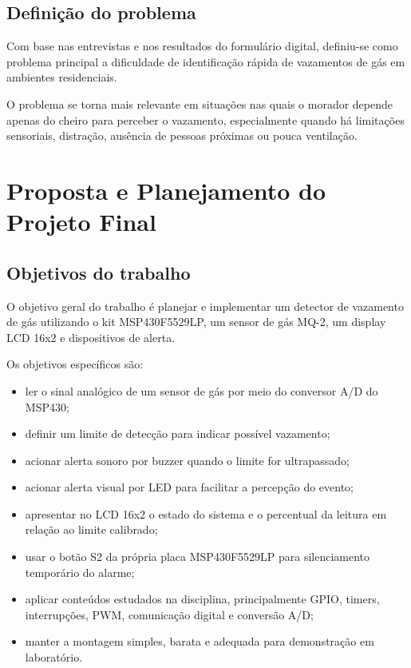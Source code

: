 \documentclass[11pt,a4paper]{article}
\numberwithin{equation}{section}
\begin{document}
\subsection{Definição do problema}

Com base nas entrevistas e nos resultados do formulário digital, definiu-se como problema principal a
dificuldade de identificação rápida de vazamentos de gás em ambientes residenciais.

O problema se torna mais relevante em situações nas quais o morador depende apenas do cheiro para
perceber o vazamento, especialmente quando há limitações sensoriais, distração, ausência de pessoas
próximas ou pouca ventilação.

\section{Proposta e Planejamento do Projeto Final}
\label{cap:proposta}

\subsection{Objetivos do trabalho}

O objetivo geral do trabalho é planejar e implementar um detector de vazamento de gás utilizando o kit
MSP430F5529LP, um sensor de gás MQ-2, um display LCD 16x2 e dispositivos de alerta.

Os objetivos específicos são:

\begin{itemize}
  \item ler o sinal analógico de um sensor de gás por meio do conversor A/D do MSP430;
  \item definir um limite de detecção para indicar possível vazamento;
  \item acionar alerta sonoro por buzzer quando o limite for ultrapassado;
  \item acionar alerta visual por LED para facilitar a percepção do evento;
  \item apresentar no LCD 16x2 o estado do sistema e o percentual da leitura em relação ao limite
        calibrado;
  \item usar o botão S2 da própria placa MSP430F5529LP para silenciamento temporário do alarme;
  \item aplicar conteúdos estudados na disciplina, principalmente GPIO, timers, interrupções, PWM,
        comunicação digital e conversão A/D;
  \item manter a montagem simples, barata e adequada para demonstração em laboratório.
\end{itemize}
\end{document}
